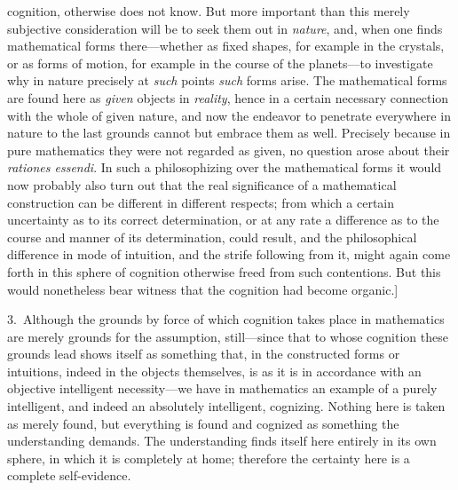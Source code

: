 \documentclass[12pt,a4paper]{book}
\begin{document}
cognition, otherwise does not know. But more important than this merely subjective
consideration will be to seek them out in \emph{nature}, and, when one finds
mathematical forms there---whether as fixed shapes, for example in the crystals,
or as forms of motion, for example in the course of the planets---to investigate
why in nature precisely at \emph{such} points \emph{such} forms arise. The mathematical
forms are found here as \emph{given} objects in \emph{reality}, hence in a certain
necessary connection with the whole of given nature, and now the endeavor to
penetrate everywhere in nature to the last grounds cannot but embrace them as
well. Precisely because in pure mathematics they were not regarded as given, no
question arose about their \textit{rationes essendi}. In such a philosophizing over
the mathematical forms it would now probably also turn out that the real
significance of a mathematical construction can be different in different respects;
from which a certain uncertainty as to its correct determination, or at any rate a
difference as to the course and manner of its determination, could result, and the
philosophical difference in mode of intuition, and the strife following from it,
might again come forth in this sphere of cognition otherwise freed from such
contentions. But this would nonetheless bear witness that the cognition had become
organic.]

3.~Although the grounds by force of which cognition takes place in mathematics are
merely grounds for the assumption, still---since that to whose cognition these
grounds lead shows itself as something that, in the constructed forms or
intuitions, indeed in the objects themselves, is as it is in accordance with an
objective intelligent necessity---we have in mathematics an example of a purely
intelligent, and indeed an absolutely intelligent, cognizing. Nothing here is
taken as merely found, but everything is found and cognized as something the
understanding demands. The understanding finds itself here entirely in its own
sphere, in which it is completely at home; therefore the certainty here is a
complete self-evidence.
\end{document}

